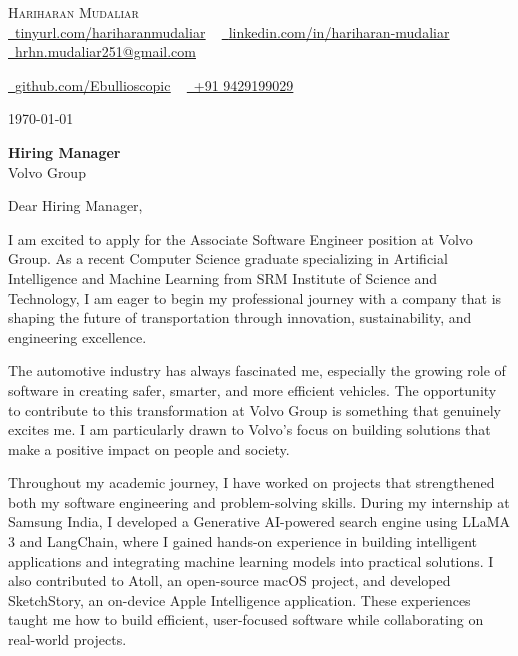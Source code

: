 \documentclass[letterpaper,11pt]{article}
\begin{document}
\begin{center}
    {\Huge \scshape Hariharan Mudaliar} \\ \vspace{1pt}
    \href{https://tinyurl.com/hariharanmudaliar}{\raisebox{-0.2\height}\faLink\ \underline{tinyurl.com/hariharanmudaliar}} ~
    \href{https://linkedin.com/in/hariharan-mudaliar}{\raisebox{-0.2\height}\faLinkedin\ \underline{linkedin.com/in/hariharan-mudaliar}} ~
    \href{mailto:hrhn.mudaliar251@gmail.com}{\raisebox{-0.2\height}\faEnvelope\ \underline{hrhn.mudaliar251@gmail.com}} ~
    
    \href{https://github.com/Ebullioscopic}{\raisebox{-0.2\height}\faGithub\ \underline{github.com/Ebullioscopic}} ~
    \href{tel:+919429199029}{\raisebox{-0.2\height}\faPhone\ +91 9429199029}
\end{center}

\vspace{20pt}

\today

\vspace{10pt}

\noindent
\textbf{Hiring Manager} \\
Volvo Group

\vspace{15pt}

\noindent
Dear Hiring Manager,

\vspace{10pt}

I am excited to apply for the Associate Software Engineer position at Volvo Group. As a recent Computer Science graduate specializing in Artificial Intelligence and Machine Learning from SRM Institute of Science and Technology, I am eager to begin my professional journey with a company that is shaping the future of transportation through innovation, sustainability, and engineering excellence.

The automotive industry has always fascinated me, especially the growing role of software in creating safer, smarter, and more efficient vehicles. The opportunity to contribute to this transformation at Volvo Group is something that genuinely excites me. I am particularly drawn to Volvo's focus on building solutions that make a positive impact on people and society.

Throughout my academic journey, I have worked on projects that strengthened both my software engineering and problem-solving skills. During my internship at Samsung India, I developed a Generative AI-powered search engine using LLaMA 3 and LangChain, where I gained hands-on experience in building intelligent applications and integrating machine learning models into practical solutions. I also contributed to Atoll, an open-source macOS project, and developed SketchStory, an on-device Apple Intelligence application. These experiences taught me how to build efficient, user-focused software while collaborating on real-world projects.
\end{document}
